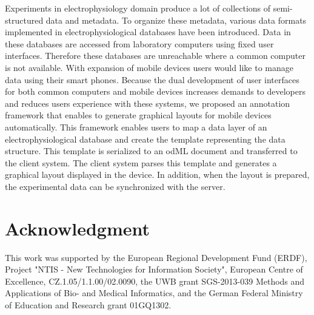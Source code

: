 \documentclass[a4paper,twoside]{article}
\begin{document}
Experiments in electrophysiology domain produce a lot of collections of semi-structured data and metadata. To organize these metadata, various data formats implemented in electrophysiological databases have been introduced. Data in these databases are accessed from laboratory computers using fixed user interfaces. Therefore these databases are unreachable where a common computer is not available. With expansion of mobile devices users would like to manage data using their smart phones. Because the dual development of user interfaces for both common computers and mobile devices increases demands to developers and reduces users experience with these systems, we proposed an annotation framework that enables to generate graphical layouts for mobile devices automatically. This framework enables users to map a data layer of an electrophysiological database and create the template representing the data structure. This template is serialized to an odML document and transferred to the client system. The client system parses this template and generates a graphical layout displayed in the device. In addition, when the layout is prepared, the experimental data can be synchronized with the server.




\section*{Acknowledgment}


This work was supported by the European Regional Development Fund (ERDF), Project "NTIS - New Technologies for Information Society", European Centre of Excellence, CZ.1.05/1.1.00/02.0090, the UWB grant SGS-2013-039 Methods and Applications of Bio- and Medical Informatics, and the German Federal Ministry of Education and Research grant 01GQ1302.







%
\end{document}
